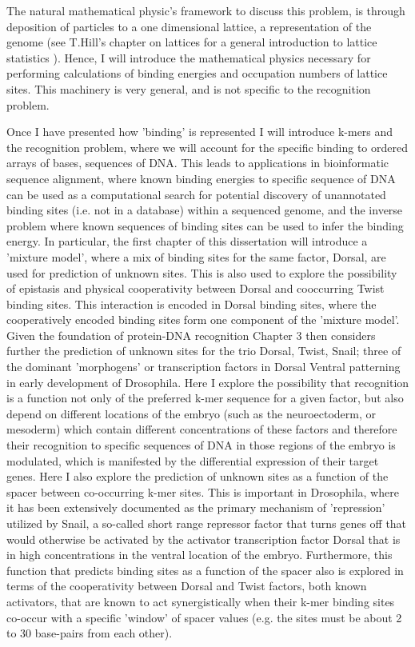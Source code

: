    The natural mathematical physic's framework to discuss this problem, is through deposition of particles to a one dimensional lattice, a representation of the genome (see T.Hill's chapter on lattices for a general introduction to lattice statistics \cite{hill1986introduction}).  Hence, I will introduce the mathematical physics necessary for performing calculations of binding energies and occupation numbers of lattice sites.  This machinery is very general, and is not specific to the recognition problem.  

Once I have presented how 'binding' is represented I will introduce k-mers and the recognition problem, where we will account for the specific binding to ordered arrays of bases, sequences of DNA.  This leads to applications in bioinformatic sequence alignment, where known binding energies to specific sequence of DNA can be used as a computational search for potential discovery of unannotated binding sites (i.e. not in a database) within a sequenced genome, and the inverse problem where known sequences of binding sites can be used to infer the binding energy.  In particular, the first chapter of this dissertation will introduce a 'mixture model', where a mix of binding sites for the same factor, Dorsal, are used for prediction of unknown sites.  This is also used to explore the possibility of epistasis and physical cooperativity between Dorsal and cooccurring Twist binding sites.  This interaction is encoded in Dorsal binding sites, where the cooperatively encoded binding sites form one component of the 'mixture model'.  Given the foundation of protein-DNA recognition Chapter 3 then considers further the prediction of unknown sites for the trio Dorsal, Twist, Snail; three of the dominant 'morphogens' or transcription factors in Dorsal Ventral patterning in early development of Drosophila.  Here I explore the possibility that recognition is a function not only of the preferred k-mer sequence for a given factor, but also depend on different locations of the embryo (such as the neuroectoderm, or mesoderm) which contain different concentrations of these factors and therefore their recognition to specific sequences of DNA in those regions of the embryo is modulated, which is manifested by the differential expression of their target genes.  Here I also explore the prediction of unknown sites as a function of the spacer between co-occurring k-mer sites.  This is important in Drosophila, where it has been extensively documented as the primary mechanism of 'repression' utilized by Snail, a so-called short range repressor factor that turns genes off that would otherwise be activated by the activator transcription factor Dorsal that is in high concentrations in the ventral location of the embryo.  Furthermore, this function that predicts binding sites as a function of the spacer also is explored in terms of the cooperativity between Dorsal and Twist factors, both known activators, that are known to act synergistically when their k-mer binding sites co-occur with a specific 'window' of spacer values (e.g. the sites must be about 2 to 30 base-pairs from each other).   

